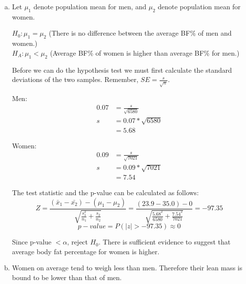{
\begin{enumerate}[(a)]
\item Let $\mu_1$ denote population mean for men, and $\mu_2$ denote population mean for women.

$H_0: \mu_1 = \mu_2$ (There is no difference between the average BF\% of men and women.) \\
$H_A: \mu_1 < \mu_2$ (Average BF\% of women is higher than average BF\% for men.)

Before we can do the hypothesis test we must first calculate the standard deviations of the two samples. Remember, $SE = \frac{s}{\sqrt{n}}$. \\

\begin{minipage}[c]{0.5\textwidth}
\begin{center}
Men: 
\begin{align*}
0.07 &= \frac{s}{\sqrt{6580}} \\
s &= 0.07 * \sqrt{6580} \\
&= 5.68
\end{align*}
\end{center}
\end{minipage}
\begin{minipage}[c]{0.5\textwidth}
\begin{center}
Women: 
\begin{align*}
0.09 &= \frac{s}{\sqrt{7021}} \\
s &= 0.09 * \sqrt{7021} \\
&= 7.54
\end{align*}
\end{center}
\end{minipage}

The test statistic and the p-value can be calculated as follows:
\[ Z = \frac{(\bar{x}_1 - \bar{x_2}) - (\mu_1 - \mu_2)}{\sqrt{ \frac{s_1^2}{n_1} + \frac{s_2}{n_2} }} = \frac{(23.9 - 35.0) - 0}{ \sqrt{\frac{5.68 ^2}{6580} + \frac{7.54 ^2}{7021}} } = -97.35 \]
\[ p-value = P(|z| > -97.35) \approx 0 \]

Since p-value $< \alpha$, reject $H_0$. There is sufficient evidence to suggest that average body fat percentage for women is higher.

\item Women on average tend to weigh less than men. Therefore their lean mass is bound to be lower than that of men.

\end{enumerate}

}


